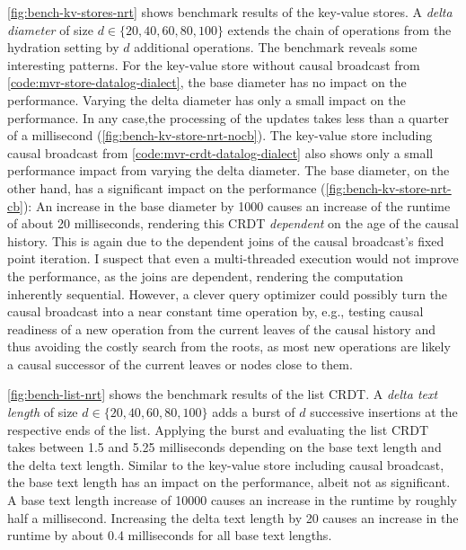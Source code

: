 

\ref{fig:bench-kv-stores-nrt} shows benchmark results of the key-value stores.
A \emph{delta diameter} of size \(d \in \{20, 40, 60, 80, 100\}\) extends the
chain of operations from the hydration setting by \(d\) additional operations.
The benchmark reveals some interesting patterns.
For the key-value store without causal broadcast
from \ref{code:mvr-store-datalog-dialect},
the base diameter has no impact on the performance.
Varying the delta diameter has only a small impact on the performance.
In any case,the processing of the updates takes less than a quarter of a
millisecond (\ref{fig:bench-kv-store-nrt-nocb}).
The key-value store including causal broadcast
from \ref{code:mvr-crdt-datalog-dialect} also shows only a small performance
impact from varying the delta diameter.
The base diameter, on the other hand, has a significant impact on the performance
(\ref{fig:bench-kv-store-nrt-cb}):
An increase in the base diameter by 1000 causes an increase of the runtime of
about 20 milliseconds, rendering this \ac{CRDT} \emph{dependent} on the age
of the causal history.
This is again due to the dependent joins of the causal broadcast's fixed point
iteration.
I suspect that even a multi-threaded execution would not improve the performance,
as the joins are dependent, rendering the computation inherently sequential.
However, a clever query optimizer could possibly turn the causal broadcast into
a near constant time operation by, e.g., testing causal readiness of a new operation
from the current leaves of the causal history and thus avoiding the
costly search from the roots, as most new operations are likely a causal successor
of the current leaves or nodes close to them.



\ref{fig:bench-list-nrt} shows the benchmark results of the list \ac{CRDT}.
A \emph{delta text length} of size \(d \in \{20, 40, 60, 80, 100\}\) adds
a burst of \(d\) successive insertions at the respective ends of the list.
Applying the burst and evaluating the list \ac{CRDT} takes between 1.5 and
5.25 milliseconds depending on the base text length and the delta text length.
Similar to the key-value store including causal broadcast,
the base text length has an impact on the performance, albeit not as significant.
A base text length increase of 10000 causes an increase in the runtime by roughly
half a millisecond.
Increasing the delta text length by 20 causes an increase in the runtime
by about 0.4 milliseconds for all base text lengths.

